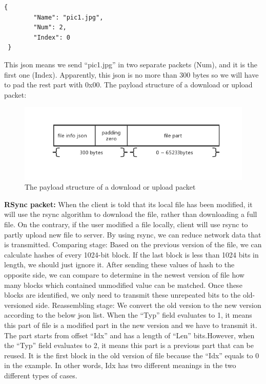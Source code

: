 \documentclass{article}
\begin{document}
\begin{lstlisting}
{
	    "Name": "pic1.jpg",
	    "Num": 2,
	    "Index": 0
 }
\end{lstlisting}

This json means we send “pic1.jpg” in two separate packets (Num), and it is the first one (Index). Apparently, this json is no more than 300 bytes so we will have to pad the rest part with 0x00.
\newline
\hfill \break
The payload structure of a download or upload packet:

 \begin{figure}[H]
     \centering
     \includegraphics[width=1.1\textwidth]{payload-structure}
     \caption{The payload structure of a download or upload packet}
     \label{fig:payload-structure}
 \end{figure}

 \textbf{RSync packet:} When the client is told that its local file has been modified, it will use the rsync algorithm to download the file, rather than downloading a full file. On the contrary, if the user modified a file locally, client will use rsync to partly upload new file to server. By using rsync, we can reduce network data that is transmitted.
 \newline
 \hfill \break
Comparing stage:
Based on the previous version of the file, we can calculate hashes of every 1024-bit block. If the last block is less than 1024 bits in length, we should just ignore it. After sending these values of hash to the opposite side, we can compare to determine in the newest version of file how many blocks which contained unmodified value can be matched. Once these blocks are identified, we only need to transmit these unrepeated bits to the old-versioned side.
\newline
\hfill \break
Reassembling stage:
We convert the old version to the new version according to the below json list. When the “Typ” field evaluates to 1, it means this part of file is a modified part in the new version and we have to transmit it. The part  starts from offset “Idx” and has a length of “Len” bits.However, when the “Typ” field evaluates to 2, it means this part is a previous part that can be reused. It is the first block in the old version of file because the “Idx” equals to 0 in the example. In other words, Idx has two different meanings in the two different types of cases.
\end{document}
